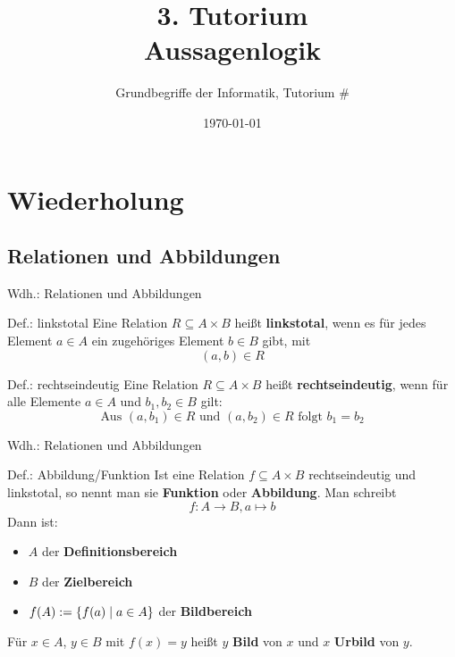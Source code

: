 



\title[Aussagenlogik]{3. Tutorium\\ Aussagenlogik}
\subtitle{Grundbegriffe der Informatik, Tutorium \#\mytutnumber}
\date{\today}


\titleframe
\roadmap

\section{Wiederholung}
\subsection{Relationen und Abbildungen}
\begin{frame}{Wdh.: Relationen und Abbildungen}
	\begin{block}{Def.: linkstotal}
	\pause
		Eine Relation $R \subseteq A \times B$ heißt \textbf{linkstotal}, wenn es für jedes Element $a \in A$ ein zugehöriges Element $b \in B$ gibt, mit $$(a,b) \in R$$
	\end{block}
	\pause
	\begin{block}{Def.: rechtseindeutig}
	\pause
		Eine Relation $R \subseteq A \times B$ heißt \textbf{rechtseindeutig}, wenn für alle Elemente $a \in A$ und $b_1, b_2 \in B$ gilt: $$\text{Aus }(a,b_1) \in R \text{ und } (a,b_2) \in R \text{ folgt }  b_1 = b_2$$
	\end{block}
\end{frame}

\begin{frame}{Wdh.: Relationen und Abbildungen}
	\begin{block}{Def.: Abbildung/Funktion}
		Ist eine Relation $f \subseteq A \times B$ rechtseindeutig und linkstotal, so nennt man sie \textbf{Funktion} oder \textbf{Abbildung}. 
		Man schreibt
		\[
			f : A \to B, a \mapsto b %
		\]
		\pause
		Dann ist:
		\begin{itemize}
			\item \(A\) der \textbf{Definitionsbereich}
			\item \(B\) der \textbf{Zielbereich}
			\item \(f(A) := \{ f(a) \mid a \in A \}\) der \textbf{Bildbereich}
		\end{itemize}
		Für \(x \in A\), \(y \in B\) mit \(f(x)=y\) heißt \(y\) \textbf{Bild} von \(x\) und \(x\) \textbf{Urbild} von \(y\).
	\end{block}
\end{frame}

